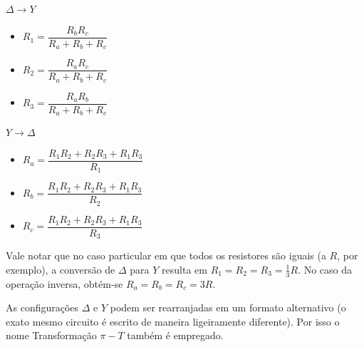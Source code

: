 \documentclass{article}
\numberwithin{equation}{section}
\newlength\Colsep
\begin{document}
\vspace{1.2cm}

\noindent\begin{minipage}{\textwidth}
\begin{minipage}[c][2cm][c]{\dimexpr0.45\textwidth-0.5\Colsep\relax}
    \begin{center}
    $\Delta \longrightarrow Y$
      \vspace{0.2cm}
     \begin{itemize}
        \item $R_1=\dfrac{R_bR_c}{R_a+R_b+R_c}$
        \item $R_2=\dfrac{R_aR_c}{R_a+R_b+R_c}$
        \item $R_3=\dfrac{R_aR_b}{R_a+R_b+R_c}$
    \end{itemize}

    \end{center}
\end{minipage} \hfill
\begin{minipage}[c][2cm][c]{\dimexpr0.1\textwidth-0.5\Colsep\relax}

\end{minipage} \hfill
\begin{minipage}[c][2cm][c]{\dimexpr0.45\textwidth-0.5\Colsep\relax}
    \begin{center}
    $Y \longrightarrow \Delta$
    \vspace{0.2cm}

    \begin{itemize}
    \item $R_a=\dfrac{R_1R_2+R_2R_3+R_1R_3}{R_1}$
    \item $R_b=\dfrac{R_1R_2+R_2R_3+R_1R_3}{R_2}$
    \item $R_c=\dfrac{R_1R_2+R_2R_3+R_1R_3}{R_3}$
\end{itemize}

    \end{center}
\end{minipage}
\end{minipage}

\vspace{1.5cm}


Vale notar que no caso particular em que todos os resistores são iguais (a $R$, por exemplo), a conversão de $\Delta$ para $Y$ resulta em $R_1=R_2=R_3=\frac{1}{3}R$. No caso da operação inversa, obtém-se $R_a=R_b=R_c=3R$.

As configurações $\Delta$ e $Y$ podem ser rearranjadas em um formato alternativo (o exato mesmo circuito é escrito de maneira ligeiramente diferente). Por isso o nome Transformação $\pi-T$ também é empregado.
\end{document}
